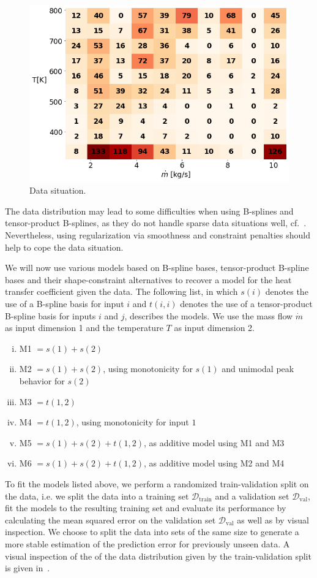 \begin{figure}[H]
	\centering
	\includegraphics[width=0.8\columnwidth]{graphics/pgfplots/cha5/data_distribution.png}
	\caption{Data situation.}
	\label{fig:ebner_data_situation}
\end{figure}

The data distribution may lead to some difficulties when using B-splines and tensor-product B-splines, as they do not handle sparse data situations well, cf.~. Nevertheless, using regularization via smoothness and constraint penalties should help to cope the data situation. 

We will now use various models based on B-spline bases, tensor-product B-spline bases and their shape-constraint alternatives to recover a model for the heat transfer coefficient given the data. The following list, in which $s(i)$ denotes the use of a B-spline basis for input $i$ and $t(i,i)$ denotes the use of a tensor-product B-spline basis for inputs $i$ and $j$, describes the models. We use the mass flow $\dot{m}$ as input dimension 1 and the temperature $T$ as input dimension 2. 

\begin{enumerate}[(i)]
	\item M1 $= s(1) + s(2)$
	\item M2 $= s(1) + s(2)$, using monotonicity for $s(1)$ and unimodal peak behavior for $s(2)$
	\item M3 $= t(1,2)$
	\item M4 $= t(1,2)$, using monotonicity for input $1$
	\item M5 $= s(1) + s(2) + t(1,2)$, as additive model using M1 and M3
	\item M6 $= s(1) +s(2) + t(1,2)$, as additive model using M2 and M4
\end{enumerate}
%
To fit the models listed above, we perform a randomized train-validation split on the data, i.e. we split the data into a training set $\mathcal{D}_{\text{train}}$ and a validation set $\mathcal{D}_{\text{val}}$, fit the models to the resulting training set and evaluate its performance by calculating the mean squared error on the validation set $\mathcal{D}_{\text{val}}$ as well as by visual inspection. We choose to split the data into sets of the same size to generate a more stable estimation of the prediction error for previously unseen data. A visual inspection of the of the data distribution given by the train-validation split is given in~.

